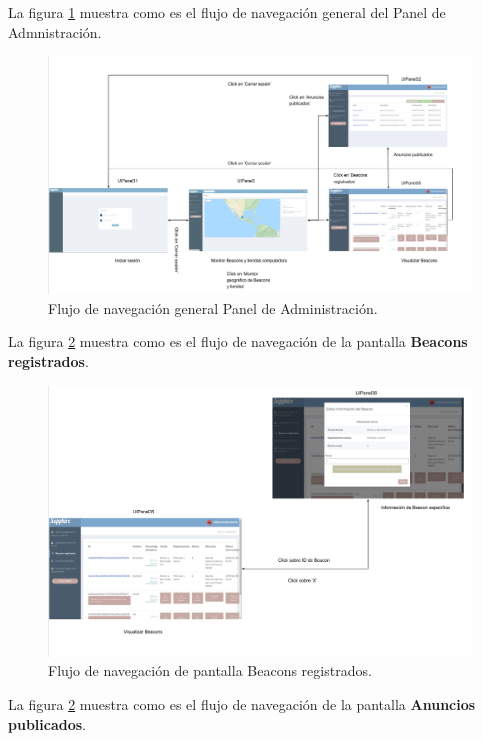 La figura \ref{PA:flujo4} muestra como es el flujo de navegación general del Panel de Admnistración.

\FloatBarrier
\begin{figure}[htbp!]
		\centering
			\includegraphics[width=1 \textwidth]{imagenes/paneladminmapa/general3}
		\caption{Flujo de navegación general Panel de Administración.}
		\label{PA:flujo4}
\end{figure}
\FloatBarrier



La figura \ref{PA:flujoBeacons} muestra como es el flujo de navegación de la pantalla \textbf{Beacons registrados}.

\FloatBarrier
\begin{figure}[htbp!]
		\centering
			\includegraphics[width=1 \textwidth]{imagenes/paneladminmapa/beacons3}
		\caption{Flujo de navegación de pantalla Beacons registrados.}
		\label{PA:flujoBeacons}
\end{figure}
\FloatBarrier

La figura \ref{PA:flujoBeacons} muestra como es el flujo de navegación de la pantalla \textbf{Anuncios publicados}.

